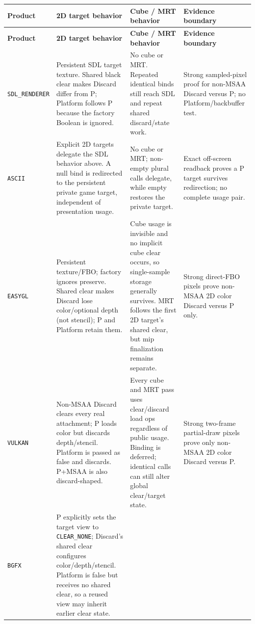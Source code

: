 \begingroup
\footnotesize
\setlength{\tabcolsep}{3pt}
\renewcommand{\arraystretch}{1.13}
\begin{longtable}{@{}p{}p{}p{}p{}@{}}
\toprule
\textbf{Product} & \textbf{2D target behavior} & \textbf{Cube / MRT behavior} &
\textbf{Evidence boundary} \\
\midrule
\endfirsthead
\toprule
\textbf{Product} & \textbf{2D target behavior} & \textbf{Cube / MRT behavior} &
\textbf{Evidence boundary} \\
\midrule
\endhead
\texttt{SDL\_\allowbreak{}RENDERER}
  & Persistent SDL target texture. Shared black clear makes Discard differ from P;
    Platform follows P because the factory Boolean is ignored.
  & No cube or MRT. Repeated identical binds still reach SDL and repeat shared discard/state
    work.
  & Strong sampled-pixel proof for non-MSAA Discard versus P; no Platform/backbuffer test. \\
\texttt{ASCII}
  & Explicit 2D targets delegate the SDL behavior above. A null bind is redirected to the
    persistent private game target, independent of presentation usage.
  & No cube or MRT; non-empty plural calls delegate, while empty restores the private target.
  & Exact off-screen readback proves a P target survives redirection; no complete usage pair. \\
\texttt{EASYGL}
  & Persistent texture/FBO; factory ignores preserve. Shared clear makes Discard lose
    color/optional depth (not stencil); P and Platform retain them.
  & Cube usage is invisible and no implicit cube clear occurs, so single-sample storage
    generally survives. MRT follows the first 2D target's shared clear, but mip finalization
    remains separate.
  & Strong direct-FBO pixels prove non-MSAA 2D color Discard versus P only. \\
\texttt{VULKAN}
  & Non-MSAA Discard clears every real attachment; P loads color but discards depth/stencil.
    Platform is passed as false and discards. P+MSAA is also discard-shaped.
  & Every cube and MRT pass uses clear/discard load ops regardless of public usage. Binding
    is deferred; identical calls can still alter global clear/target state.
  & Strong two-frame partial-draw pixels prove only non-MSAA 2D color Discard versus P. \\
\texttt{BGFX}
  & P explicitly sets the target view to \texttt{CLEAR\_NONE}; Discard's shared clear
    configures color/depth/stencil. Platform is false but receives no shared clear, so a reused
    view may inherit earlier clear state.

\end{longtable}
